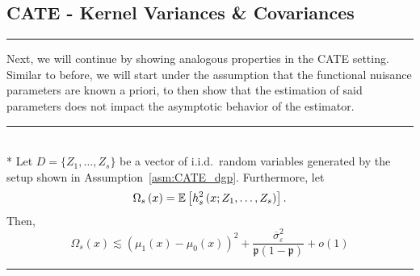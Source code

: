 \subsection{CATE - Kernel Variances \& Covariances}
\hrule
Next, we will continue by showing analogous properties in the CATE setting.
Similar to before, we will start under the assumption that the functional nuisance parameters are known a priori, to then show that the estimation of said parameters does not impact the asymptotic behavior of the estimator.
\vspace{0.5cm}
\hrule

\begin{lem}\label{lem:CATE_omega_s}\mbox{}\\*
	Let $D = \{Z_1, \dotsc, Z_{s}\}$ be a vector of i.i.d.\ random variables generated by the setup shown in Assumption~\ref{asm:CATE_dgp}.
	Furthermore, let
	\begin{equation}
		\Omega_{s}\left(x\right)
		= \mathbb{E}\left[h_{s}^{2}\left(x; Z_1, \ldots,  Z_{s}\right)\right].
	\end{equation}
	Then,
	\begin{equation}
		\Omega_{s}\left(x\right)
		\lesssim \left(\mu_{1}\left(x\right) - \mu_{0}\left(x\right)\right)^2 + \frac{\overline{\sigma}^2_{\varepsilon}}{\mathfrak{p}\left(1 - \mathfrak{p}\right)} + o(1)
	\end{equation}
\end{lem}
\hrule
